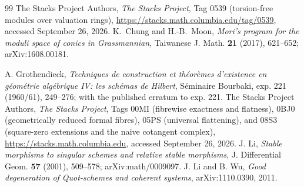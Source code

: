 \documentclass[11pt,reqno]{amsart}
\numberwithin{equation}{section}
\theoremstyle{definition}\newtheorem{definition}[theorem]{Definition}
\theoremstyle{remark}\newtheorem{remark}[theorem]{Remark}
\begin{document}
\begin{thebibliography}{99}
The Stacks Project Authors, \emph{The Stacks Project},
Tag 0539 (torsion-free modules over valuation rings),
\url{https://stacks.math.columbia.edu/tag/0539}, accessed September 26, 2026.
K.~Chung and H.-B.~Moon, \emph{Mori's program for the moduli space
of conics in Grassmannian}, Taiwanese J. Math. \textbf{21} (2017),
621--652; arXiv:1608.00181.

A. Grothendieck, \emph{Techniques de construction et th\'eor\`emes
d'existence en g\'eom\'etrie alg\'ebrique IV: les sch\'emas de Hilbert},
S\'eminaire Bourbaki, exp. 221 (1960/61), 249--276; with the published
erratum to exp. 221.
The Stacks Project Authors, \emph{The Stacks Project},
Tags 00MI (fibrewise exactness and flatness), 0BJ0 (geometrically
reduced formal fibres), 05PS (universal flattening), and 08S3
(square-zero extensions and the naive cotangent complex),
\url{https://stacks.math.columbia.edu}, accessed September 26, 2026.
J. Li, \emph{Stable morphisms to singular schemes and relative
stable morphisms}, J. Differential Geom. \textbf{57} (2001),
509--578; arXiv:math/0009097.
J. Li and B. Wu, \emph{Good degeneration of Quot-schemes and
coherent systems}, arXiv:1110.0390, 2011.

\end{thebibliography}
\end{document}

